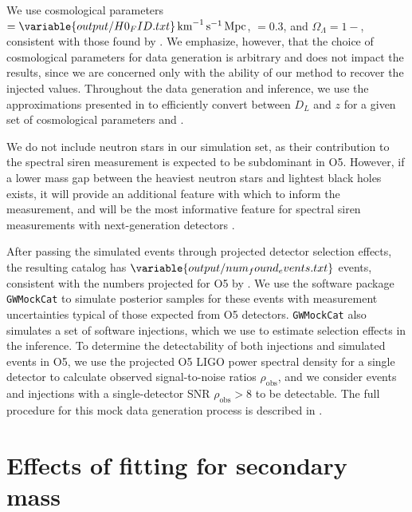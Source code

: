 \documentclass[preprint2,linenumbers]{aastex631}
\begin{document}
We use cosmological parameters \Ho$=\variable{output/H0_FID.txt}\Hunits$, \Omm$=0.3$, and $\Omega_\Lambda=1-$\Omm, consistent with those found by \citet{planck_collaboration_planck_2016}.
We emphasize, however, that the choice of cosmological parameters for data generation is arbitrary and does not impact the results, since we are concerned only with the ability of our method to recover the injected values.
Throughout the data generation and inference, we use the approximations presented in \citet{adachi_analytical_2012} to efficiently convert between $D_L$ and $z$ for a given set of cosmological parameters \Omm{} and \Ho.

We do not include neutron stars in our simulation set, as their contribution to the spectral siren measurement is expected to be subdominant in \ac{O5}.
However, if a lower mass gap between the heaviest neutron stars and lightest black holes exists, it will provide an additional feature with which to inform the measurement, and will be the most informative feature for spectral siren measurements with next-generation detectors \citep{ezquiaga_spectral_2022}.

After passing the simulated events through projected detector selection effects, the resulting catalog has $\variable{output/num_found_events.txt}$ events, consistent with the numbers projected for \ac{O5} by \citet{kiendrebeogo_updated_2023}.
We use the software package \texttt{GWMockCat} \citep{farah_things_2023} to simulate posterior samples for these events with measurement uncertainties typical of those expected from \ac{O5} detectors.
\texttt{GWMockCat} also simulates a set of software injections, which we use to estimate selection effects in the inference.
To determine the detectability of both injections and simulated events in O5, we use the projected \ac{O5} LIGO power spectral density \citep{obsscen_noise_curves,abbott_prospects_2020} for a single detector to calculate observed signal-to-noise ratios $\rho_{\text{obs}}$, and we consider events and injections with a single-detector SNR $\rho_{\text{obs}}>8$ to be detectable. 
The full procedure for this mock data generation process is described in \citet{fishbach_where_2017, farah_things_2023, essick_ensuring_2024}.

\section{Effects of fitting for secondary mass}
\label{ap:mass ratio}
\end{document}
